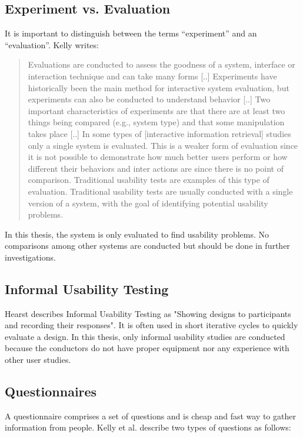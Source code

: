 \documentclass[11pt]{report}
\begin{document}
\subsection{Experiment vs. Evaluation}

It is important to distinguish between the terms ``experiment'' and an ``evaluation''. Kelly \cite{Kelly2007} writes:
\begin{quote}
Evaluations are conducted to assess the goodness of a system, interface or interaction technique and can take many forms [..] Experiments have historically been the main method for interactive system evaluation, but experiments can also be conducted to understand behavior [..] Two important characteristics of experiments are that there are at least two things being compared (e.g., system type) and that some manipulation takes place [..] In some types of [interactive information retrieval] studies only a single system is evaluated. This is a weaker form of evaluation since it is not possible to demonstrate how much better users perform or how different their behaviors and inter actions are since there is no point of comparison. Traditional usability tests are examples of this type of evaluation. Traditional usability tests are usually conducted with a single version of a system, with the goal of identifying potential usability problems.	
\end{quote}

In this thesis, the system is only evaluated to find usability problems. No comparisons among other systems are conducted but should be done in further investigations.

\subsection{Informal Usability Testing}

Hearst \cite{Hearst2009} describes Informal Usability Testing as "Showing designs to participants and recording their responses". It is often used in short iterative cycles to quickly evaluate a design. In this thesis, only informal usability studies are conducted because the conductors do not have proper equipment nor any experience with other user studies.

\subsection{Questionnaires}

A questionnaire comprises a set of questions and is cheap and fast way to gather information from people. Kelly et al. \cite{Kelly2008} describe two types of questions as follows:
\end{document}
